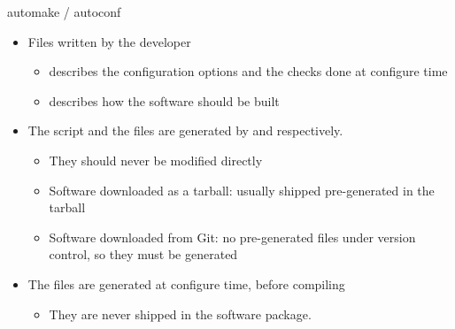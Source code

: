 \begin{frame}{automake / autoconf}
  \begin{itemize}
  \item Files written by the developer
    \begin{itemize}
    \item {} describes the configuration options and
      the checks done at configure time
    \item {} describes how the software should be
      built
    \end{itemize}
  \item The  script and the  files
    are generated by  and  respectively.
    \begin{itemize}
    \item They should never be modified directly
    \item Software downloaded as a tarball: usually shipped
      pre-generated in the tarball
    \item Software downloaded from Git: no pre-generated files under
      version control, so they must be generated
    \end{itemize}
  \item The  files are generated at configure time, before
    compiling
    \begin{itemize}
    \item They are never shipped in the software package.
    \end{itemize}
  \end{itemize}
\end{frame}

